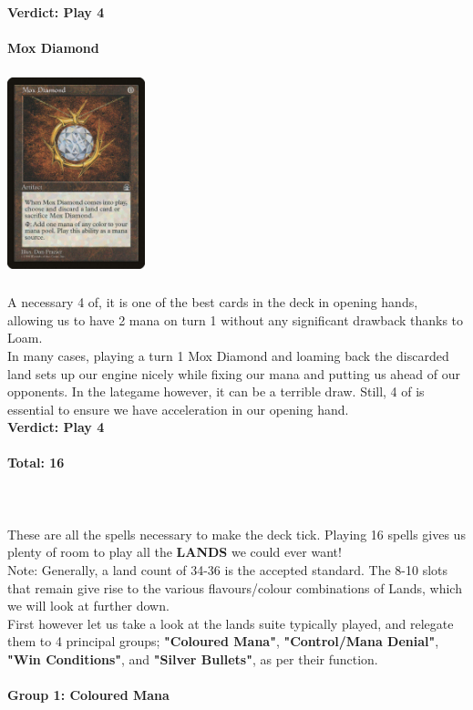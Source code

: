 \documentclass{report}
\begin{document}
\textbf{Verdict: Play 4\\\\}
\textbf{Mox Diamond\\}
\begin{center}
\includegraphics [width = 4cm, height = 6cm] {mox-diamond}\\
\end{center}
A necessary 4 of, it is one of the best cards in the deck in opening hands, allowing us to have 2 mana on turn 1 without any significant drawback thanks to Loam.\\ In many cases, playing a turn 1 Mox Diamond and loaming back the discarded land sets up our engine nicely while fixing our mana and putting us ahead of our opponents. In the lategame however, it can be a terrible draw. Still, 4 of is essential to ensure we have acceleration in our opening hand.\\
\textbf{Verdict: Play 4}\\\\
\textbf{Total: 16}\\\\\\\\
These are all the spells necessary to make the deck tick. Playing 16 spells gives us plenty of room to play all the \textbf{LANDS} we could ever want!\\
Note: Generally, a land count of 34-36 is the accepted standard. The 8-10 slots that remain give rise to the various flavours/colour combinations of Lands, which we will look at further down.\\
First however let us take a look at the lands suite typically played, and relegate them to 4 principal groups; \textbf{"Coloured Mana"}, \textbf{"Control/Mana Denial"}, \textbf{"Win Conditions"}, and \textbf{"Silver Bullets"}, as per their function.\\\\
\textbf{Group 1: Coloured Mana}\\
\end{document}
